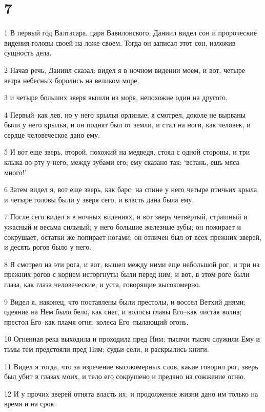 \chapter{7}

\par 1 В первый год Валтасара, царя Вавилонского, Даниил видел сон и пророческие видения головы своей на ложе своем. Тогда он записал этот сон, изложив сущность дела.
\par 2 Начав речь, Даниил сказал: видел я в ночном видении моем, и вот, четыре ветра небесных боролись на великом море,
\par 3 и четыре больших зверя вышли из моря, непохожие один на другого.
\par 4 Первый--как лев, но у него крылья орлиные; я смотрел, доколе не вырваны были у него крылья, и он поднят был от земли, и стал на ноги, как человек, и сердце человеческое дано ему.
\par 5 И вот еще зверь, второй, похожий на медведя, стоял с одной стороны, и три клыка во рту у него, между зубами его; ему сказано так: `встань, ешь мяса много!'
\par 6 Затем видел я, вот еще зверь, как барс; на спине у него четыре птичьих крыла, и четыре головы были у зверя сего, и власть дана была ему.
\par 7 После сего видел я в ночных видениях, и вот зверь четвертый, страшный и ужасный и весьма сильный; у него большие железные зубы; он пожирает и сокрушает, остатки же попирает ногами; он отличен был от всех прежних зверей, и десять рогов было у него.
\par 8 Я смотрел на эти рога, и вот, вышел между ними еще небольшой рог, и три из прежних рогов с корнем исторгнуты были перед ним, и вот, в этом роге были глаза, как глаза человеческие, и уста, говорящие высокомерно.
\par 9 Видел я, наконец, что поставлены были престолы, и воссел Ветхий днями; одеяние на Нем было бело, как снег, и волосы главы Его--как чистая волна; престол Его--как пламя огня, колеса Его--пылающий огонь.
\par 10 Огненная река выходила и проходила пред Ним; тысячи тысяч служили Ему и тьмы тем предстояли пред Ним; судьи сели, и раскрылись книги.
\par 11 Видел я тогда, что за изречение высокомерных слов, какие говорил рог, зверь был убит в глазах моих, и тело его сокрушено и предано на сожжение огню.
\par 12 И у прочих зверей отнята власть их, и продолжение жизни дано им только на время и на срок.
